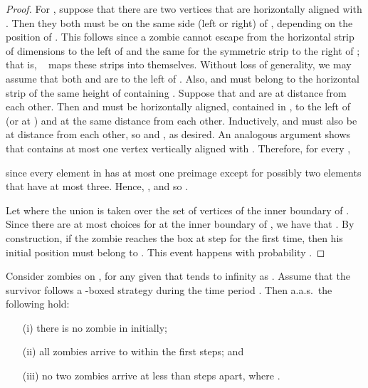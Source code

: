 \documentclass[12pt]{amsart}
\begin{document}
\begin{proof}
For , suppose that there are two vertices  that are horizontally aligned with . Then they both must be on the same side
(left or right) of , depending on the position of . This follows since a zombie cannot escape from the horizontal strip of dimensions  to the left of  and the same for the symmetric strip to the right of ; that is, ~ maps these strips into themselves. Without loss of generality, we may assume that both  and  are to the left of . Also,  and  must belong to the horizontal strip  of
the same height of  containing . Suppose that  and  are at distance  from each other. Then  and  must be horizontally aligned, contained in , to the
left of  (or at ) and at the same distance  from each other. Inductively,  and  must also be at distance  from each other, so  and , as desired. An analogous argument shows that   contains at most one vertex vertically aligned with
. Therefore, for every ,

since every element in  has at most one preimage except for possibly two elements that have at most three. Hence,
, and so .

Let  where the union is taken over the set  of vertices of the inner boundary of . Since there are at most  choices for  at the inner boundary of , we have that . By construction, if the zombie
reaches the box  at step  for the first time, then his initial position  must belong to . This event happens with probability .
\end{proof}
\begin{lemma}\label{lem:usefultorus}
Consider  zombies on , for any given  that tends to infinity as . Assume that the survivor follows a -boxed strategy during the time period . Then a.a.s.\ the
following hold:
\begin{enumerate}
\item[(i)]
there is no zombie in  initially;
\item[(ii)]
all zombies arrive to  within the first  steps; and
\item[(iii)]
no two zombies arrive at  less than  steps apart, where .
\end{enumerate}
\end{lemma}
\end{document}
